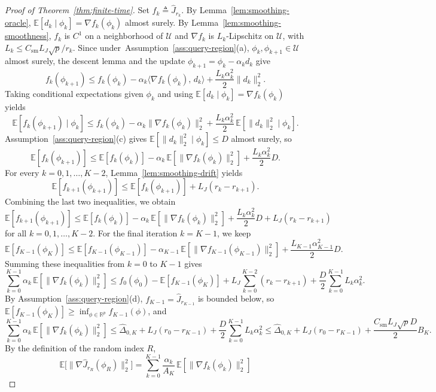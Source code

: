 \documentclass[11pt, letterpaper, oneside, reqno]{amsart}
\newcommand{\R}{\mathbb{R}}
\newcommand{\Let}{\triangleq}
\begin{document}
\begin{proof}[Proof of Theorem~\ref{thm:finite-time}]
Set $f_k\Let\hat J_{r_k}$. By Lemma~\ref{lem:smoothing-oracle}, $\mathbb E[d_k\mid\phi_k]=\nabla f_k(\phi_k)$ almost surely. By Lemma~\ref{lem:smoothing-smoothness}, $f_k$ is $C^1$ on a neighborhood of $\mathcal U$ and
$\nabla f_k$ is $L_k$-Lipschitz on $\mathcal U$, with
$L_k\le C_{\mathrm{sm}}L_J\sqrt p/r_k$. 
Since under~Assumption~\ref{ass:query-region}(a), $\phi_k,\phi_{k+1}\in\mathcal U$ almost surely, the descent lemma and the update $\phi_{k+1}=\phi_k-\alpha_k d_k$ give
\[
f_k(\phi_{k+1})
\le f_k(\phi_k) -\alpha_k \big\langle \nabla f_k(\phi_k),\, d_k\big\rangle +\frac{L_k\alpha_k^2}{2}\|d_k\|_2^2.
\]
Taking conditional expectations given $\phi_k$ and using
$\mathbb E[d_k\mid \phi_k]=\nabla f_k(\phi_k)$
yields
\[
\mathbb E[f_k(\phi_{k+1})\mid \phi_k]
\le f_k(\phi_k) -\alpha_k \|\nabla f_k(\phi_k)\|_2^2 +\frac{L_k\alpha_k^2}{2}\,\mathbb E[\|d_k\|_2^2\mid \phi_k].
\]
Assumption~\ref{ass:query-region}(c) gives
$\mathbb E[\|d_k\|_2^2\mid \phi_k]\le D$ almost surely,
so
\[
\mathbb E[f_k(\phi_{k+1})]
\le \mathbb E[f_k(\phi_k)] -\alpha_k\,\mathbb E[\|\nabla f_k(\phi_k)\|_2^2] +\frac{L_k\alpha_k^2}{2}D.
\]
For every $k=0,1,\dots,K-2$, Lemma~\ref{lem:smoothing-drift} yields
\[
\mathbb E[f_{k+1}(\phi_{k+1})]
\le \mathbb E[f_k(\phi_{k+1})] + L_J(r_k-r_{k+1}).
\]
Combining the last two inequalities, we obtain
\[
\mathbb E[f_{k+1}(\phi_{k+1})]
\le \mathbb E[f_k(\phi_k)] -\alpha_k\,\mathbb E[\|\nabla f_k(\phi_k)\|_2^2] +\frac{L_k\alpha_k^2}{2}D + L_J(r_k-r_{k+1})
\]
for all $k=0,1,\dots,K-2$.
For the final iteration $k=K-1$, we keep
\[
\mathbb E[f_{K-1}(\phi_K)]
\le \mathbb E[f_{K-1}(\phi_{K-1})] -\alpha_{K-1}\,\mathbb E[\|\nabla f_{K-1}(\phi_{K-1})\|_2^2] +\frac{L_{K-1}\alpha_{K-1}^2}{2}D.
\]
Summing these inequalities from $k=0$ to $K-1$ gives
\[
\sum_{k=0}^{K-1}\alpha_k\,\mathbb E[\|\nabla f_k(\phi_k)\|_2^2]
\le f_0(\phi_0)-\mathbb E[f_{K-1}(\phi_K)] + L_J\sum_{k=0}^{K-2}(r_k-r_{k+1}) + \frac{D}{2}\sum_{k=0}^{K-1}L_k\alpha_k^2.
\]
By Assumption~\ref{ass:query-region}(d), $f_{K-1}=\hat J_{r_{K-1}}$ is bounded below, so
$\mathbb E[f_{K-1}(\phi_K)]\ge \inf_{\phi\in\R^p}f_{K-1}(\phi)$, and
\[
\sum_{k=0}^{K-1}\alpha_k\,\mathbb E[\|\nabla f_k(\phi_k)\|_2^2]
\le \hat\Delta_{0,K}+L_J(r_0-r_{K-1})+\frac{D}{2}\sum_{k=0}^{K-1}L_k\alpha_k^2
\le \hat\Delta_{0,K}+L_J(r_0-r_{K-1})+\frac{C_{\mathrm{sm}}L_J\sqrt p D}{2} B_K.
\]
By the definition of the random index $R$,
\[
\mathbb E\big[\|\nabla \hat J_{r_R}(\phi_R)\|_2^2\big]
= \sum_{k=0}^{K-1}\frac{\alpha_k}{A_K}\,\mathbb E[\|\nabla f_k(\phi_k)\|_2^2]
\]
\end{proof}
\end{document}
